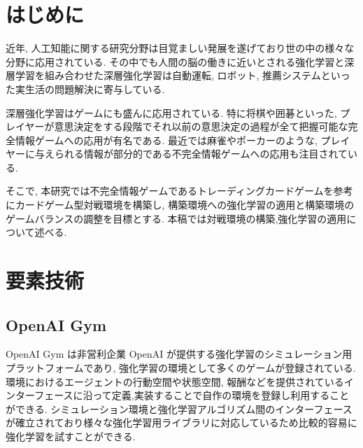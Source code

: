 \documentclass[twocolumn]{jarticle}     %
\begin{document}

\section{はじめに}
近年, 人工知能に関する研究分野は目覚ましい発展を遂げており世の中の様々な分野に応用されている. その中でも人間の脳の働きに近いとされる強化学習と深層学習を組み合わせた深層強化学習は自動運転, ロボット, 推薦システムといった実生活の問題解決に寄与している.\par
深層強化学習はゲームにも盛んに応用されている.
特に将棋や囲碁といった, プレイヤーが意思決定をする段階でそれ以前の意思決定の過程が全て把握可能な完全情報ゲームへの応用が有名である. 
最近では麻雀やポーカーのような, プレイヤーに与えられる情報が部分的である不完全情報ゲームへの応用も注目されている.
\par
そこで, 本研究では不完全情報ゲームであるトレーディングカードゲームを参考にカードゲーム型対戦環境を構築し, 構築環境への強化学習の適用と構築環境のゲームバランスの調整を目標とする. 本稿では対戦環境の構築,強化学習の適用について述べる.

\section{要素技術}

\subsection{OpenAI Gym}
OpenAI Gym は非営利企業 OpenAI が提供する強化学習のシミュレーション用プラットフォームであり, 強化学習の環境として多くのゲームが登録されている\cite{OpenAIGym}. 環境におけるエージェントの行動空間や状態空間, 報酬などを提供されているインターフェースに沿って定義,実装することで自作の環境を登録し利用することができる. シミュレーション環境と強化学習アルゴリズム間のインターフェースが確立されており様々な強化学習用ライブラリに対応しているため比較的容易に強化学習を試すことができる.
\end{document}
